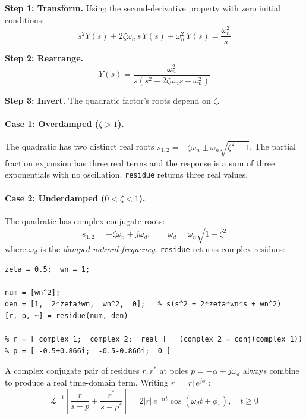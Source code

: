 \documentclass[12pt]{article}
\begin{document}
\textbf{Step 1: Transform.}  Using the second-derivative property with zero
initial conditions:
\[
  s^2 Y(s) + 2\zeta\omega_n\,s\,Y(s) + \omega_n^2\,Y(s) = \frac{\omega_n^2}{s}
\]

\textbf{Step 2: Rearrange.}
\begin{equation}
  Y(s) = \frac{\omega_n^2}{s\!\left(s^2 + 2\zeta\omega_n s + \omega_n^2\right)}
  \label{eq:so_ys}
\end{equation}

\textbf{Step 3: Invert.}  The quadratic factor's roots depend on $\zeta$.

\paragraph{Case 1: Overdamped ($\zeta > 1$).}  The quadratic has two distinct
real roots $s_{1,2} = -\zeta\omega_n \pm \omega_n\sqrt{\zeta^2 - 1}$.  The
partial fraction expansion has three real terms and the response is a sum of
three exponentials with no oscillation.  \texttt{residue} returns three real
values.

\paragraph{Case 2: Underdamped ($0 < \zeta < 1$).}  The quadratic has complex
conjugate roots:
\begin{equation}
  s_{1,2} = -\zeta\omega_n \pm j\omega_d,
  \qquad \omega_d = \omega_n\sqrt{1 - \zeta^2}
  \label{eq:complex_poles}
\end{equation}
where $\omega_d$ is the \emph{damped natural frequency}.  \texttt{residue}
returns complex residues:
\begin{Verbatim}[frame=single, fontsize=\small]
zeta = 0.5;  wn = 1;

num = [wn^2];
den = [1,  2*zeta*wn,  wn^2,  0];   % s(s^2 + 2*zeta*wn*s + wn^2)
[r, p, ~] = residue(num, den)

% r = [ complex_1;  complex_2;  real ]   (complex_2 = conj(complex_1))
% p = [ -0.5+0.866i;  -0.5-0.866i;  0 ]
\end{Verbatim}

A complex conjugate pair of residues $r, r^*$ at poles $p = -\alpha \pm
j\omega_d$ always combine to produce a real time-domain term.  Writing
$r = |r|\,e^{j\phi_r}$:
\begin{equation}
  \mathcal{L}^{-1}\!\left[\frac{r}{s-p} + \frac{r^*}{s-p^*}\right]
  = 2|r|\,e^{-\alpha t}\cos(\omega_d t + \phi_r), \quad t \geq 0
  \label{eq:complex_pair}
\end{equation}
\end{document}
